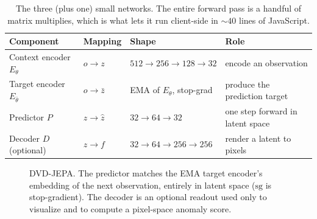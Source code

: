 \documentclass[11pt]{article}
\begin{document}
\begin{table}[h]
\centering\small
\begin{tabular}{@{}llll@{}}
\toprule
Component & Mapping & Shape & Role \\
\midrule
Context encoder $E_\theta$ & $o \to z$ & $512\!\to\!256\!\to\!128\!\to\!32$ & encode an observation \\
Target encoder $E_{\bar\theta}$ & $o \to \bar z$ & EMA of $E_\theta$, stop-grad & produce the prediction target \\
Predictor $P$ & $z \to \hat z$ & $32\!\to\!64\!\to\!32$ & one step forward in latent space \\
Decoder $D$ (optional) & $z \to f$ & $32\!\to\!64\!\to\!256\!\to\!256$ & render a latent to pixels \\
\bottomrule
\end{tabular}
\caption{The three (plus one) small networks. The entire forward pass is a handful of matrix multiplies,
which is what lets it run client-side in ${\sim}40$ lines of JavaScript.}
\label{tab:arch}
\end{table}

\begin{figure}[h]
\centering
{}
\caption{DVD-JEPA. The predictor matches the EMA target encoder's embedding of the next observation,
entirely in latent space ($\mathrm{sg}$ is stop-gradient). The decoder is an optional readout used only
to visualize and to compute a pixel-space anomaly score.}
\label{fig:arch}
\end{figure}
\end{document}
